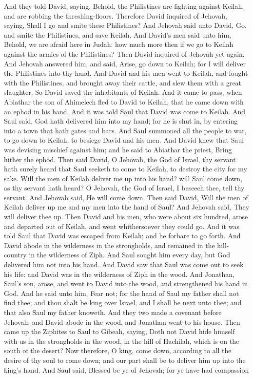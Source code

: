 And they told David, saying, Behold, the Philistines are fighting against Keilah, and are robbing the threshing-floors. Therefore David inquired of Jehovah, saying, Shall I go and smite these Philistines? And Jehovah said unto David, Go, and smite the Philistines, and save Keilah. And David’s men said unto him, Behold, we are afraid here in Judah: how much more then if we go to Keilah against the armies of the Philistines? Then David inquired of Jehovah yet again. And Jehovah answered him, and said, Arise, go down to Keilah; for I will deliver the Philistines into thy hand. And David and his men went to Keilah, and fought with the Philistines, and brought away their cattle, and slew them with a great slaughter. So David saved the inhabitants of Keilah. And it came to pass, when Abiathar the son of Ahimelech fled to David to Keilah, that he came down with an ephod in his hand.  And it was told Saul that David was come to Keilah. And Saul said, God hath delivered him into my hand; for he is shut in, by entering into a town that hath gates and bars. And Saul summoned all the people to war, to go down to Keilah, to besiege David and his men. And David knew that Saul was devising mischief against him; and he said to Abiathar the priest, Bring hither the ephod. Then said David, O Jehovah, the God of Israel, thy servant hath surely heard that Saul seeketh to come to Keilah, to destroy the city for my sake. Will the men of Keilah deliver me up into his hand? will Saul come down, as thy servant hath heard? O Jehovah, the God of Israel, I beseech thee, tell thy servant. And Jehovah said, He will come down. Then said David, Will the men of Keilah deliver up me and my men into the hand of Saul? And Jehovah said, They will deliver thee up. Then David and his men, who were about six hundred, arose and departed out of Keilah, and went whithersoever they could go. And it was told Saul that David was escaped from Keilah; and he forbare to go forth. And David abode in the wilderness in the strongholds, and remained in the hill-country in the wilderness of Ziph. And Saul sought him every day, but God delivered him not into his hand.  And David saw that Saul was come out to seek his life: and David was in the wilderness of Ziph in the wood. And Jonathan, Saul’s son, arose, and went to David into the wood, and strengthened his hand in God. And he said unto him, Fear not; for the hand of Saul my father shall not find thee; and thou shalt be king over Israel, and I shall be next unto thee; and that also Saul my father knoweth. And they two made a covenant before Jehovah: and David abode in the wood, and Jonathan went to his house.  Then came up the Ziphites to Saul to Gibeah, saying, Doth not David hide himself with us in the strongholds in the wood, in the hill of Hachilah, which is on the south of the desert? Now therefore, O king, come down, according to all the desire of thy soul to come down; and our part shall be to deliver him up into the king’s hand. And Saul said, Blessed be ye of Jehovah; for ye have had compassion 